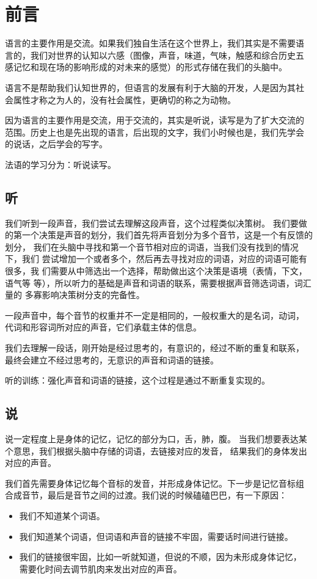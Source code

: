 
\chapter{前言}


语言的主要作用是交流。如果我们独自生活在这个世界上，我们其实是不需要语
言的，我们对世界的认知以六感（图像，声音，味道，气味，触感和综合历史五
感记忆和现在场的影响形成的对未来的感觉）的形式存储在我们的头脑中。

语言不是帮助我们认知世界的，但语言的发展有利于大脑的开发，人是因为其社
会属性才称之为人的，没有社会属性，更确切的称之为动物。


因为语言的主要作用是交流，用于交流的，其实是听说，读写是为了扩大交流的
范围。历史上也是先出现的语言，后出现的文字，我们小时候也是，我们先学会
的说话，之后学会的写字。




法语的学习分为：听说读写。


\section{听}


我们听到一段声音，我们尝试去理解这段声音，这个过程类似决策树。
我们要做的第一个决策是声音的划分，我们首先将声音划分为多个音节，这是一个有反馈的划分，
我们在头脑中寻找和第一个音节相对应的词语，当我们没有找到的情况下，我们
尝试增加一个或者多个，然后再去寻找对应的词语，对应的词语可能有很多，我
们需要从中筛选出一个选择，帮助做出这个决策是语境（表情，下文，语气等
等），所以听力的基础是声音和词语的联系，需要根据声音筛选词语，词汇量的
多寡影响决策树分支的完备性。

一段声音中，每个音节的权重并不一定是相同的，一般权重大的是名词，动词，
代词和形容词所对应的声音，它们承载主体的信息。


我们去理解一段话，刚开始是经过思考的，有意识的，经过不断的重复和联系，
最终会建立不经过思考的，无意识的声音和词语的链接。

听的训练：强化声音和词语的链接，这个过程是通过不断重复实现的。


\section{说}

说一定程度上是身体的记忆，记忆的部分为口，舌，肺，腹。
当我们想要表达某个意思，我们根据头脑中存储的词语，去链接对应的发音，
结果我们的身体发出对应的声音。

我们首先需要身体记忆每个音标的发音，并形成身体记忆。下一步是记忆音标组
合成音节，最后是音节之间的过渡。我们说的时候磕磕巴巴，有一下原因：
\begin{itemize}
\item 我们不知道某个词语。
\item 我们知道某个词语，但词语和声音的链接不牢固，需要话时间进行链接。
\item 我们的链接很牢固，比如一听就知道，但说的不顺，因为未形成身体记忆，
  需要化时间去调节肌肉来发出对应的声音。
\end{itemize}

